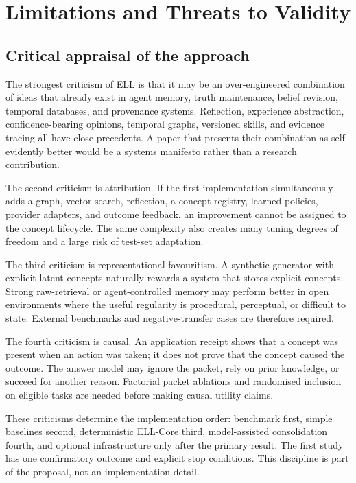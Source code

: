 \documentclass[
  english,
  a4paper,
  DIV=11,
  numbers=noendperiod]{scrreprt}
\begin{document}

\chapter{Limitations and Threats to
Validity}\label{limitations-and-threats-to-validity}

\section{Critical appraisal of the
approach}\label{critical-appraisal-of-the-approach}

The strongest criticism of ELL is that it may be an over-engineered
combination of ideas that already exist in agent memory, truth
maintenance, belief revision, temporal databases, and provenance
systems. Reflection, experience abstraction, confidence-bearing
opinions, temporal graphs, versioned skills, and evidence tracing all
have close precedents. A paper that presents their combination as
self-evidently better would be a systems manifesto rather than a
research contribution.

The second criticism is attribution. If the first implementation
simultaneously adds a graph, vector search, reflection, a concept
registry, learned policies, provider adapters, and outcome feedback, an
improvement cannot be assigned to the concept lifecycle. The same
complexity also creates many tuning degrees of freedom and a large risk
of test-set adaptation.

The third criticism is representational favouritism. A synthetic
generator with explicit latent concepts naturally rewards a system that
stores explicit concepts. Strong raw-retrieval or agent-controlled
memory may perform better in open environments where the useful
regularity is procedural, perceptual, or difficult to state. External
benchmarks and negative-transfer cases are therefore required.

The fourth criticism is causal. An application receipt shows that a
concept was present when an action was taken; it does not prove that the
concept caused the outcome. The answer model may ignore the packet, rely
on prior knowledge, or succeed for another reason. Factorial packet
ablations and randomised inclusion on eligible tasks are needed before
making causal utility claims.

These criticisms determine the implementation order: benchmark first,
simple baselines second, deterministic ELL-Core third, model-assisted
consolidation fourth, and optional infrastructure only after the primary
result. The first study has one confirmatory outcome and explicit stop
conditions. This discipline is part of the proposal, not an
implementation detail.
\end{document}
